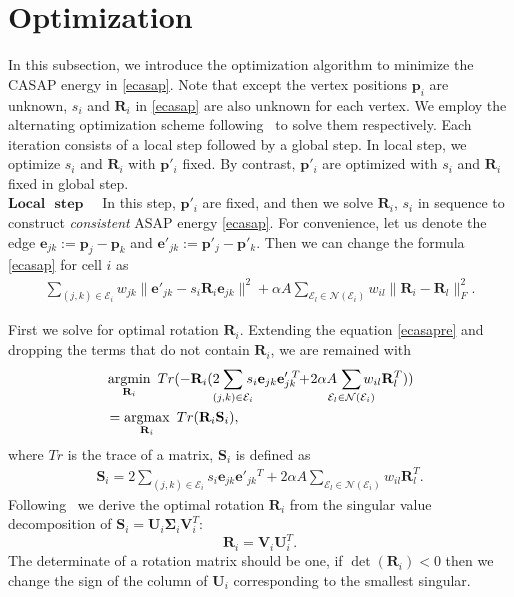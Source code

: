 
\section{Optimization}
In this subsection, we introduce the optimization algorithm to minimize the CASAP energy in \eqref{ecasap}. Note that except the vertex positions $\mathbf p_i$ are unknown, $s_i$ and $\mathbf R_i$ in \eqref{ecasap} are also unknown for each vertex. We employ the alternating optimization scheme following~\citep{sorkine2007rigid,yamazaki2013non,levi2015smooth} to solve them respectively. Each iteration consists of a local step followed by a global step. In local step, we optimize $s_i$ and $\mathbf R_i$ with $\mathbf p'_i$ fixed. By contrast, $\mathbf p'_i$ are optimized with $s_i$ and $\mathbf R_i$ fixed in global step.\\

$\textbf{Local}$ $\textbf{ step}$ ~~In this step, $\mathbf p'_i$ are fixed, and then we solve $\mathbf R_i$, $s_i$ in sequence to construct \emph{consistent} ASAP energy \eqref{ecasap}. For convenience, let us denote the edge $\mathbf e_{jk}:=\mathbf p_j-\mathbf p_k$ and $\mathbf e'_{jk}:=\mathbf p'_j-\mathbf p'_k$. Then we can change the formula \eqref{ecasap} for cell $i$ as
\begin{align}
\displaystyle \!\!\!\!\sum_{(j,k)\in\mathcal{E}_i}\!\!\!\!w_{jk}\|\mathbf e'_{jk}\!-\!s_i\!\mathbf R_i\mathbf e_{jk}\|^2\!+\!\alpha A\!\!\!\!\!\!\!\sum_{\mathcal{E}_l \in \mathcal{N}(\mathcal{E}_i)}\!\!\!\!\!\!w_{il}\|\mathbf R_i\!-\!\mathbf R_l\|_F^2 .\label{ecasapre}
\end{align}

First we solve for optimal rotation $\mathbf R_i$. Extending the equation \eqref{ecasapre} and dropping the terms that do not contain $\mathbf R_i$, we are remained with
\begin{align}
 &\argmin_{\mathbf R_i}~Tr(-\mathbf R_i(2\!\!\!\!\sum_{(j,k)\in\mathcal{E}_i}\!\!\!\!s_i\mathbf e_{jk}{\mathbf e'_{jk}}\!\!^T\!\!+\!2\alpha A\!\!\!\!\!\sum_{\mathcal{E}_l \in \mathcal{N}(\mathcal{E}_i)}\!\!\!\!\!\!w_{il}\mathbf R_l^T)) \nonumber\\
  &=\argmax_{\mathbf R_i}~Tr(\mathbf R_i\mathbf S_i),
\end{align}
where $Tr$ is the trace of a matrix, $\mathbf S_i$ is defined as
\begin{align*}
\mathbf S_i = 2\!\!\!\sum_{(j,k)\in\mathcal{E}_i}\!\!s_i\mathbf e_{jk}{\mathbf e'_{jk}}\!\!^T+2\alpha A\!\!\!\sum_{\mathcal{E}_l \in \mathcal{N}(\mathcal{E}_i)}\!\!\!\!\!\!w_{il}\mathbf R_l^T.
\end{align*}
Following~\cite{sorkine2007rigid} we derive the optimal rotation $\mathbf R_i$ from the singular value decomposition of $\mathbf S_i = \mathbf U_i\mathbf \Sigma_i\mathbf V_i^T$:
\begin{equation}\label{R}
\mathbf R_i = \mathbf V_i\mathbf U_i^T.
\end{equation}
The determinate of a rotation matrix should be one, if $\det(\mathbf R_i)<0$ then we change the sign of the column of $\mathbf U_i$ corresponding to the smallest singular.\\

